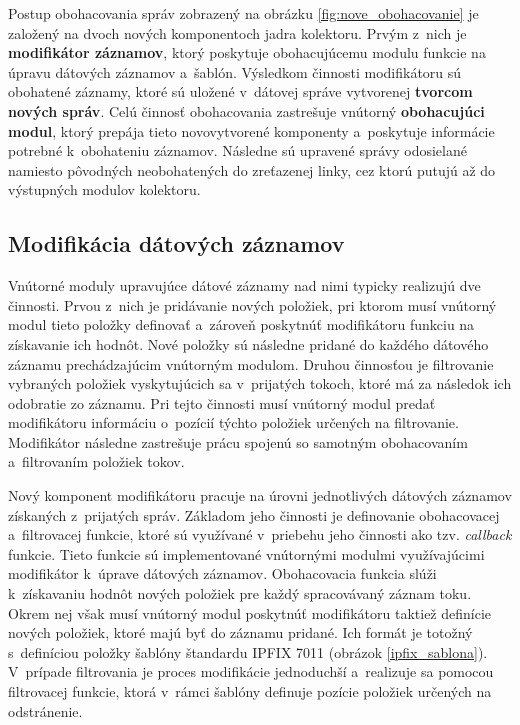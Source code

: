 Postup obohacovania správ zobrazený na obrázku \ref{fig:nove_obohacovanie} je založený na dvoch nových komponentoch jadra kolektoru. Prvým z~nich je \textbf{modifikátor záznamov}, ktorý poskytuje obohacujúcemu modulu funkcie na úpravu
dátových záznamov a~šablón. Výsledkom činnosti modifikátoru sú obohatené záznamy, ktoré sú uložené v~dátovej správe vytvorenej \textbf{tvorcom nových správ}. Celú činnosť obohacovania zastrešuje vnútorný \textbf{obohacujúci modul}, ktorý
prepája tieto novovytvorené komponenty a~poskytuje informácie potrebné k~obohateniu záznamov. Následne sú upravené správy odosielané namiesto pôvodných neobohatených do zreťazenej linky, cez ktorú putujú až do výstupných modulov kolektoru.

\subsection*{Modifikácia dátových záznamov}
Vnútorné moduly upravujúce dátové záznamy nad nimi typicky realizujú dve činnosti. Prvou z~nich je pridávanie nových položiek, pri ktorom musí vnútorný modul tieto položky definovať a~zároveň poskytnúť modifikátoru funkciu na získavanie
ich hodnôt. Nové položky sú následne pridané do každého dátového záznamu prechádzajúcim vnútorným modulom. Druhou činnosťou je filtrovanie vybraných položiek vyskytujúcich sa v~prijatých tokoch, ktoré má za následok ich odobratie zo záznamu.
Pri tejto činnosti musí vnútorný modul predať modifikátoru informáciu o~pozícií týchto položiek určených na filtrovanie. Modifikátor následne zastrešuje prácu spojenú so samotným obohacovaním a~filtrovaním položiek tokov.

Nový komponent modifikátoru pracuje na úrovni jednotlivých dátových záznamov získaných z~prijatých správ. Základom jeho činnosti je definovanie obohacovacej a~filtrovacej funkcie, ktoré sú využívané v~priebehu jeho činnosti ako tzv. \textit{callback}
funkcie. Tieto funkcie sú implementované vnútornými modulmi využívajúcimi modifikátor k~úprave dátových záznamov. Obohacovacia funkcia slúži k~získavaniu hodnôt nových položiek pre každý spracovávaný záznam toku.
Okrem nej však musí vnútorný modul poskytnúť modifikátoru taktiež definície nových položiek, ktoré majú byť do záznamu pridané. Ich formát je totožný s~definíciou položky šablóny štandardu IPFIX 7011
(obrázok \ref{ipfix_sablona}). V~prípade filtrovania je proces modifikácie jednoduchší a~realizuje sa pomocou filtrovacej funkcie, ktorá v~rámci šablóny definuje pozície položiek určených na odstránenie.

